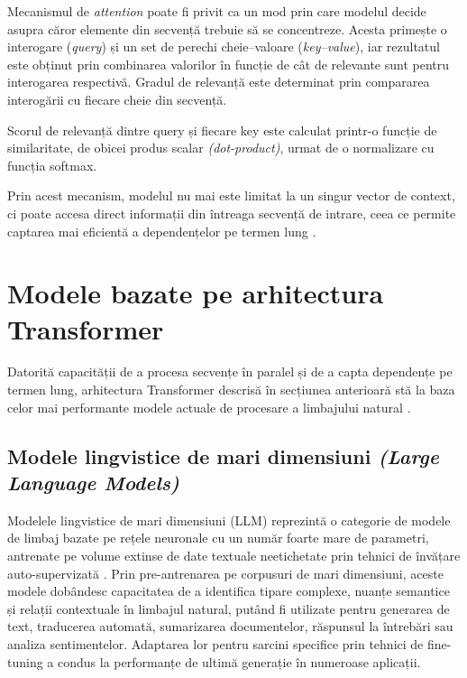 \documentclass[12pt, a4paper, oneside, romanian]{teza-upb}
\begin{document}
Mecanismul de \textit{attention} poate fi privit ca un mod prin care
modelul decide asupra căror elemente din secvență trebuie să se
concentreze. Acesta primește o interogare (\textit{query}) și un set
de perechi cheie–valoare (\textit{key–value}), iar rezultatul este
obținut prin combinarea valorilor în funcție de cât de relevante sunt
pentru interogarea respectivă. Gradul de relevanță este determinat
prin compararea interogării cu fiecare cheie din secvență. 

Scorul de relevanță dintre query și fiecare key este calculat printr-o funcție de similaritate, de obicei produs scalar \textit{(dot-product)}, urmat de o normalizare cu funcția softmax.

Prin acest mecanism, modelul nu mai este limitat la un singur vector de context, ci poate accesa direct informații din întreaga secvență de intrare, ceea ce permite captarea mai eficientă a dependențelor pe termen lung \cite{vaswani2017attention}.
    
\section{Modele bazate pe arhitectura Transformer}

Datorită capacității de a procesa secvențe în paralel și de a capta dependențe pe termen lung, arhitectura Transformer descrisă în secțiunea anterioară stă la baza celor mai performante modele actuale de procesare a limbajului natural \cite{datacamp}.

    \subsection{Modele lingvistice de mari dimensiuni \textit{(Large Language Models)}}

Modelele lingvistice de mari dimensiuni (LLM) reprezintă o categorie de modele de limbaj bazate pe rețele neuronale cu un număr foarte mare de parametri, antrenate pe volume extinse de date textuale neetichetate prin tehnici de învățare auto-supervizată \cite{brown2020language}. Prin pre-antrenarea pe corpusuri de mari dimensiuni, aceste modele dobândesc capacitatea de a identifica tipare complexe, nuanțe semantice și relații contextuale în limbajul natural, putând fi utilizate pentru generarea de text, traducerea automată, sumarizarea documentelor, răspunsul la întrebări sau analiza sentimentelor. Adaptarea lor pentru sarcini specifice prin tehnici de fine-tuning a condus la performanțe de ultimă generație în numeroase aplicații. 
\end{document}
